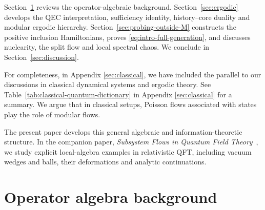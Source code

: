 \documentclass[a4paper,11pt]{article}
\theoremstyle{definition}
\begin{document}
Section~\ref{section:basics} reviews the operator-algebraic background.  Section~\ref{sec:ergodic} develops the QEC interpretation, sufficiency identity, history--core duality and modular ergodic hierarchy.  Section~\ref{sec:probing-outside-M} constructs the positive inclusion Hamiltonians, proves \eqref{eq:intro-full-generation}, and discusses nuclearity, the split flow and local spectral chaos.  We conclude in Section~\ref{sec:discussion}.  

For completeness, in Appendix \ref{sec:classical}, we have included the parallel to our discussions in classical dynamical systems and ergodic theory. See Table~\ref{tab:classical-quantum-dictionary} in Appendix \ref{sec:classical} for a summary. We argue that in classical setups, Poisson flows associated with states play the role of modular flows.

The present paper develops this general algebraic and information-theoretic structure.  In the companion paper, \emph{Subsystem Flows in Quantum Field Theory}~\cite{companionQFT}, we study explicit local-algebra examples in relativistic QFT, including vacuum wedges and balls, their deformations and analytic continuations.


\section{Operator algebra background}\label{section:basics}
\end{document}
